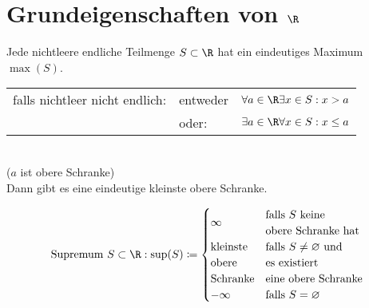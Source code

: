 \section{Grundeigenschaften von \texorpdfstring{$\R$}{R}}
Jede nichtleere endliche Teilmenge $S \subset \R$ hat ein eindeutiges Maximum $\max(S)$.\\
\begin{tabular}{lll}
	falls nichtleer nicht endlich:	&entweder	&$\forall a \in \R \exists x \in S : x > a$ \\
						&oder:	&$\exists a \in \R \forall x \in S : x \leq a$
\end{tabular}\\
($a$ ist obere Schranke) \\
Dann gibt es eine eindeutige kleinste obere Schranke.\\
\begin{def*}[note = Supremum , index = Supremum]
	\[
		\text{Supremum } S \subset \R : \sup(S) \coloneqq  \begin{cases}
			\infty				&\begin{matrix*}[l]
									\text{falls $S$ keine}					\\
									\text{obere Schranke hat}
								\end{matrix*}							\\
			\begin{matrix*}[l]
				\text{kleinste}	\\
				\text{obere}	\\
				\text{Schranke}
			\end{matrix*}			&\begin{matrix*}[l]
									\text{falls $S \neq \varnothing$ und}		\\
									\text{es existiert}					\\
									\text{eine obere Schranke}
								\end{matrix*}							\\
			-\infty					&\text{falls $S = \varnothing$}			
		\end{cases}
	\]
\end{def*}

